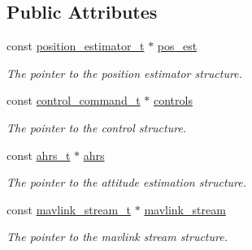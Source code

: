 \subsection*{Public Attributes}
\begin{DoxyCompactItemize}
\item 
\hypertarget{structhud__structure__t_ad414b83fdb61facd9dae34586d13c0be}{const \hyperlink{structposition__estimator__t}{position\+\_\+estimator\+\_\+t} $\ast$ \hyperlink{structhud__structure__t_ad414b83fdb61facd9dae34586d13c0be}{pos\+\_\+est}}\label{structhud__structure__t_ad414b83fdb61facd9dae34586d13c0be}

\begin{DoxyCompactList}\small\item\em The pointer to the position estimator structure. \end{DoxyCompactList}\item 
\hypertarget{structhud__structure__t_af80795da1a7ed8568f515f5139f847b1}{const \hyperlink{structcontrol__command__t}{control\+\_\+command\+\_\+t} $\ast$ \hyperlink{structhud__structure__t_af80795da1a7ed8568f515f5139f847b1}{controls}}\label{structhud__structure__t_af80795da1a7ed8568f515f5139f847b1}

\begin{DoxyCompactList}\small\item\em The pointer to the control structure. \end{DoxyCompactList}\item 
\hypertarget{structhud__structure__t_af82109317325ac264e9d65c24d29fb1d}{const \hyperlink{structahrs__t}{ahrs\+\_\+t} $\ast$ \hyperlink{structhud__structure__t_af82109317325ac264e9d65c24d29fb1d}{ahrs}}\label{structhud__structure__t_af82109317325ac264e9d65c24d29fb1d}

\begin{DoxyCompactList}\small\item\em The pointer to the attitude estimation structure. \end{DoxyCompactList}\item 
\hypertarget{structhud__structure__t_a6e0193dcddb80d7be5841ad278944a1b}{const \hyperlink{structmavlink__stream__t}{mavlink\+\_\+stream\+\_\+t} $\ast$ \hyperlink{structhud__structure__t_a6e0193dcddb80d7be5841ad278944a1b}{mavlink\+\_\+stream}}\label{structhud__structure__t_a6e0193dcddb80d7be5841ad278944a1b}

\begin{DoxyCompactList}\small\item\em The pointer to the mavlink stream structure. \end{DoxyCompactList}\end{DoxyCompactItemize}


